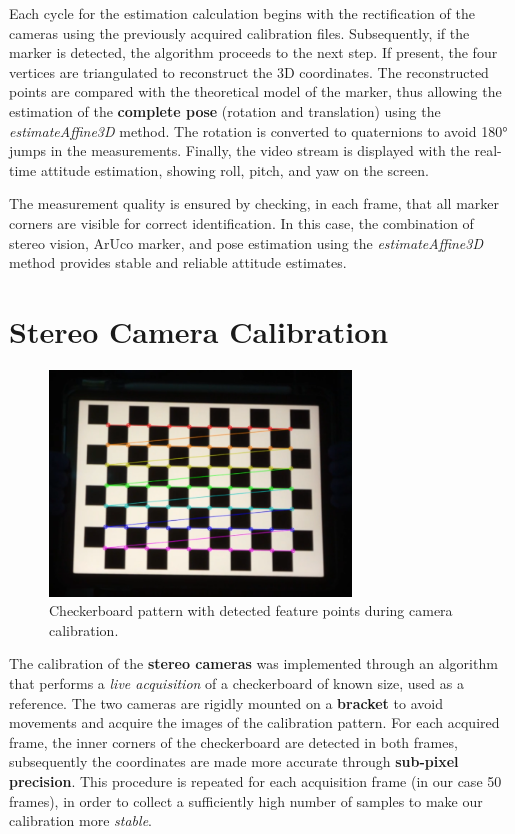 Each cycle for the estimation calculation begins with the rectification of the cameras using the previously acquired calibration files. Subsequently, if the marker is detected, the algorithm proceeds to the next step. If present, the four vertices are triangulated to reconstruct the 3D coordinates. The reconstructed points are compared with the theoretical model of the marker, thus allowing the estimation of the \textbf{complete pose} (rotation and translation) using the \textit{estimateAffine3D} method. The rotation is converted to quaternions to avoid 180° jumps in the measurements. Finally, the video stream is displayed with the real-time attitude estimation, showing roll, pitch, and yaw on the screen.

The measurement quality is ensured by checking, in each frame, that all marker corners are visible for correct identification. In this case, the combination of stereo vision, ArUco marker, and pose estimation using the \textit{estimateAffine3D} method provides stable and reliable attitude estimates.

\section{Stereo Camera Calibration}

\begin{figure}[ht]
  \centering
  \includegraphics[height=6cm]{images/calib.png}
  \caption{Checkerboard pattern with detected feature points during camera calibration.}
\end{figure}

The calibration of the \textbf{stereo cameras} was implemented through an algorithm that performs a \textit{live acquisition} of a checkerboard of known size, used as a reference. The two cameras are rigidly mounted on a \textbf{bracket} to avoid movements and acquire the images of the calibration pattern. For each acquired frame, the inner corners of the checkerboard are detected in both frames, subsequently the coordinates are made more accurate through \textbf{sub-pixel precision}. This procedure is repeated for each acquisition frame (in our case 50 frames), in order to collect a sufficiently high number of samples to make our calibration more \textit{stable}.

